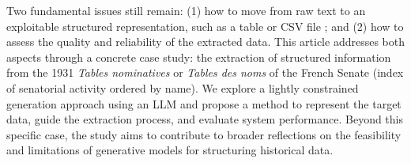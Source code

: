 

Two fundamental issues still remain: (1) how to move from raw text to an exploitable structured representation, such as a table or CSV file ; and (2) how to assess the quality and reliability of the extracted data. This article addresses both aspects through a concrete case study: the extraction of structured information from the 1931 \textit{Tables nominatives} or \textit{Tables des noms} of the French Senate (index of senatorial activity ordered by name). We explore a lightly constrained generation approach using an LLM and propose a method to represent the target data, guide the extraction process, and evaluate system performance. Beyond this specific case, the study aims to contribute to broader reflections on the feasibility and limitations of generative models for structuring historical data.

